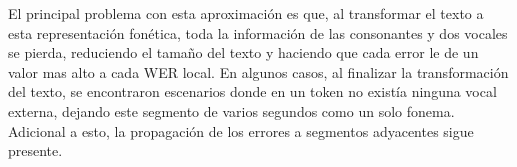 El principal problema con esta aproximación es que, al transformar el texto a esta representación fonética, toda la información de las consonantes y dos vocales se pierda, reduciendo el tamaño del texto y haciendo que cada error le de un valor mas alto a cada WER local. En algunos casos, al finalizar la transformación del texto, se encontraron escenarios donde en un token no existía ninguna vocal externa, dejando este segmento de varios segundos como un solo fonema. Adicional a esto, la propagación de los errores a segmentos adyacentes sigue presente.
